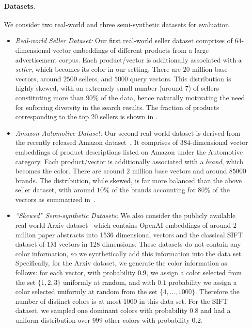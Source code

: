 \paragraph{Datasets.} We consider two real-world and three semi-synthetic datasets for evaluation.
\begin{itemize}[leftmargin=*]
    \item {\em Real-world Seller Dataset:} Our first real-world seller dataset comprises of $64$-dimensional vector embeddings of different products from a large advertisement corpus. Each product/vector is additionally associated with a \emph{seller}, which becomes its color in our setting. There are $20$ million base vectors, around $2500$ sellers, and $5000$ query vectors. This distribution is highly skewed, with an extremely small number (around $7$) of sellers constituting more than $90 \%$ of the data, hence naturally motivating the need for enforcing diversity in the search results. The fraction of products corresponding to the top 20 sellers is shown in . 


\item {\em Amazon Automotive Dataset:} Our second real-world dataset is derived from the recently released Amazon dataset~\cite{big-bench}. 
It comprises of $384$-dimensional vector embeddings of product descriptions listed on Amazon under the Automotive category. Each product/vector is additionally associated with a \emph{brand}, which becomes the color. There are around $2$ million base vectors and around $85000$ brands. The distribution, while skewed, is far more balanced than the above seller dataset, with around $10\%$ of the brands accounting for $80\%$ of the vectors as summarized in~. 

\item{\em ``Skewed'' Semi-synthetic Datasets:} We also consider the publicly available real-world Arxiv dataset~\cite{arxiv} which contains OpenAI embeddings of around 2 million paper abstracts into 1536 dimensional vectors and the classical SIFT dataset of 1M vectors in $128$ dimensions. These datasets do not contain any color information, so we synthetically add this information into the data set.  Specifically, for the Arxiv dataset, we generate the color information as follows: for each vector, with probability $0.9$, we assign a color selected from the set $\{ 1,2,3\}$ uniformly at random, and with $0.1$ probability we  assign a color selected uniformly at random from the set $\{4,\dots, 1000 \}$. Therefore the number of distinct colors is at most $1000$ in this data set. For the SIFT dataset, we sampled one dominant colors with probability $0.8$ and had a uniform distribution over $999$ other colors with probability $0.2$. 


\end{itemize}
